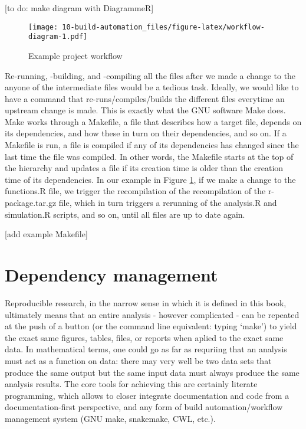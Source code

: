 \documentclass[]{book}
\begin{document}
{[}to do: make diagram with DiagrammeR{]}

\begin{figure}
\centering
\texttt{[image: 10-build-automation\_files/figure-latex/workflow-diagram-1.pdf]}
\caption{\label{fig:workflow-diagram}Example project workflow}
\end{figure}

Re-running, -building, and -compiling all the files after we made a
change to the anyone of the intermediate files would be a tedious task.
Ideally, we would like to have a command that re-runs/compiles/builds
the different files everytime an upstream change is made. This is
exactly what the GNU software Make does. Make works through a Makefile,
a file that describes how a target file, depends on its dependencies,
and how these in turn on their dependencies, and so on. If a Makefile is
run, a file is compiled if any of its dependencies has changed since the
last time the file was compiled. In other words, the Makefile starts at
the top of the hierarchy and updates a file if its creation time is
older than the creation time of its dependencies. In our example in
Figure \ref{fig:workflow-diagram}, if we make a change to the
functions.R file, we trigger the recompilation of the recompilation of
the r-package.tar.gz file, which in turn triggers a rerunning of the
analysis.R and simulation.R scripts, and so on, until all files are up
to date again.

{[}add example Makefile{]}

\chapter{Dependency management}\label{dependency-management}

Reproducible research, in the narrow sense in which it is defined in
this book, ultimately means that an entire analysis - however
complicated - can be repeated at the push of a button (or the command
line equivalent: typing `make') to yield the exact same figures, tables,
files, or reports when aplied to the exact same data. In mathematical
terms, one could go as far as requriing that an analysis must act as a
function on data: there may very well be two data sets that produce the
same output but the same input data must always produce the same
analysis results. The core tools for achieving this are certainly
literate programming, which allows to closer integrate documentation and
code from a documentation-first perspective, and any form of build
automation/workflow management system (GNU make, snakemake, CWL, etc.).
\end{document}
